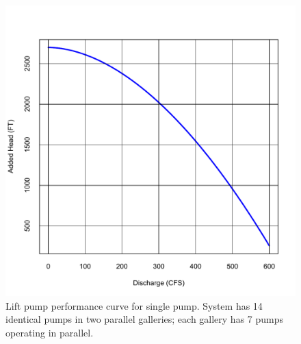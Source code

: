 \documentclass[12pt]{article}
\begin{document}
\begin{enumerate}
\begin{figure}[ht!] %
   \centering
   \includegraphics[width=6in]{pumpcurve.pdf} 
   \caption{Lift pump performance curve for single pump.   System has 14 identical pumps in two parallel galleries;  each gallery has 7 pumps operating in parallel.}
   \label{fig:pumpcurve}
\end{figure}


\end{enumerate}
\end{document}
